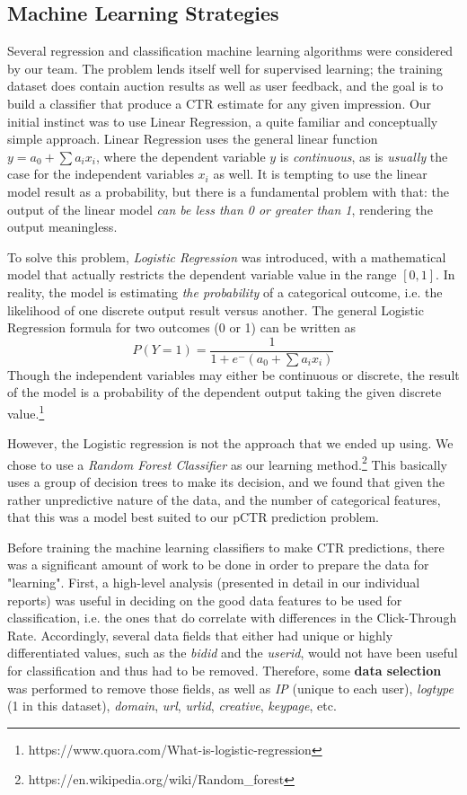 \documentclass{sig-alternate-05-2015}
\begin{document}
\subsection{Machine Learning Strategies}
Several regression and classification machine learning algorithms were considered by our team. The problem lends itself well for supervised learning; the training dataset does contain auction results as well as user feedback, and the goal is to build a classifier that produce a CTR estimate for any given impression. Our initial instinct was to use Linear Regression, a quite familiar and conceptually simple approach. Linear Regression uses the general linear function $y = a_0 +  \sum a_i x_i$, where the dependent variable $y$ is \textit{continuous}, as is \textit{usually} the case for the independent variables $x_i$ as well. It is tempting to use the linear model result as a probability, but there is a fundamental problem with that: the output of the linear model \textit{can be less than 0 or greater than 1}, rendering the output meaningless.

To solve this problem, \textit{Logistic Regression} was introduced, with a mathematical model that actually restricts the dependent variable value in the range $[0,1]$. In reality, the model is estimating \textit{the probability} of a categorical outcome, i.e. the likelihood of one discrete output result versus another. The general Logistic Regression formula for two outcomes (0 or 1) can be written as \[P(Y=1) = \frac{1}{1+e^-(a_0+\sum a_i x_i)}\]
Though the independent variables may either be continuous or discrete, the result of the model is a probability of the dependent output taking the given discrete value.\footnote{https://www.quora.com/What-is-logistic-regression}

However, the Logistic regression is not the approach that we ended up using. We chose to use a \textit{Random Forest Classifier} as our learning method.\footnote{https://en.wikipedia.org/wiki/Random\_forest} This basically uses a group of decision trees to make its decision, and we found that given the rather unpredictive nature of the data, and the number of categorical features, that this was a model best suited to our pCTR prediction problem.

Before training the machine learning classifiers to make CTR predictions, there was a significant amount of work to be done in order to prepare the data for "learning". First, a high-level analysis (presented in detail in our individual reports) was useful in deciding on the good data features to be used for classification, i.e. the ones that do correlate with differences in the Click-Through Rate. Accordingly, several data fields that either had unique or highly differentiated values, such as the \textit{bidid} and the \textit{userid}, would not have been useful for classification and thus had to be removed. Therefore, some \textbf{data selection} was performed to remove those fields, as well as \textit{IP} (unique to each user), \textit{logtype} (1 in this dataset), \textit{domain}, \textit{url}, \textit{urlid}, \textit{creative}, \textit{keypage}, etc.
\end{document}

